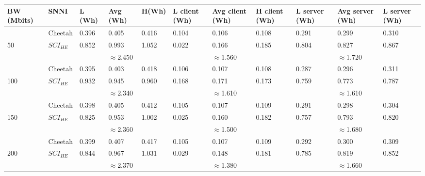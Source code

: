 \begin{tabular}{lllllllllll}
BW (Mbits) & SNNI    & L (Wh) & Avg (Wh) & H(Wh) & L client (Wh) & Avg client (Wh) & H client (Wh) & L server (Wh) & Avg server (Wh) & L server (Wh) \\ \hline
           & Cheetah & 0.396  & 0.405    & 0.416 & 0.104         & 0.106           & 0.108         & 0.291         & 0.299           & 0.310         \\
50         & $SCI_{HE}$ & 0.852  & 0.993    & 1.052 & 0.022         & 0.166           & 0.185         & 0.804         & 0.827           & 0.867         \\ \cline{3-11} 
           &         &        & $\approx$2.450    &       &               & $\approx$1.560           &               &               & $\approx$1.720           &               \\ \hline
           & Cheetah & 0.395  & 0.403    & 0.418 & 0.106         & 0.107           & 0.108         & 0.287         & 0.296           & 0.311         \\
100        & $SCI_{HE}$ & 0.932  & 0.945    & 0.960 & 0.168         & 0.171           & 0.173         & 0.759         & 0.773           & 0.787         \\ \cline{3-11} 
           &         &        & $\approx$2.340    &       &               & $\approx$1.610           &               &               & $\approx$1.610           &               \\ \hline
           & Cheetah & 0.398  & 0.405    & 0.412 & 0.105         & 0.107           & 0.109         & 0.291         & 0.298           & 0.304         \\
150        & $SCI_{HE}$ & 0.825  & 0.953    & 1.002 & 0.025         & 0.160           & 0.182         & 0.757         & 0.793           & 0.820         \\ \cline{3-11} 
           &         &        & $\approx$2.360    &       &               & $\approx$1.500           &               &               & $\approx$1.680           &               \\ \hline
           & Cheetah & 0.399  & 0.407    & 0.417 & 0.105         & 0.107           & 0.109         & 0.292         & 0.300           & 0.309         \\
200        & $SCI_{HE}$ & 0.844  & 0.967    & 1.031 & 0.029         & 0.148           & 0.181         & 0.785         & 0.819           & 0.852         \\ \cline{3-11} 
           &         &        & $\approx$2.370    &       &               & $\approx$1.380           &               &               & $\approx$1.660           &               \\ \hline

\end{tabular}
